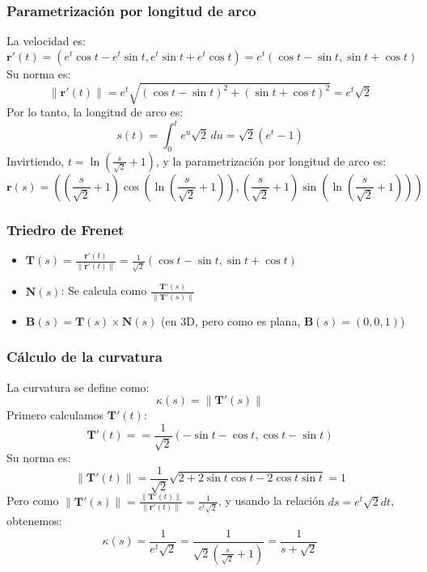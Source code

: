 \documentclass[11pt]{book}
\theoremstyle{definicion}
\theoremstyle{teorema}
\theoremstyle{ejemplo}
\begin{document}
\subsubsection{Parametrización por longitud de arco}
\noindent La velocidad es:
\[
\mathbf{r}'(t) = (e^t \cos t - e^t \sin t, e^t \sin t + e^t \cos t) = e^t (\cos t - \sin t, \sin t + \cos t)
\]
Su norma es:
\[
\|\mathbf{r}'(t)\| = e^t \sqrt{(\cos t - \sin t)^2 + (\sin t + \cos t)^2} = e^t \sqrt{2}
\]
Por lo tanto, la longitud de arco es:
\[
s(t) = \int_0^t e^u \sqrt{2} \, du = \sqrt{2} (e^t - 1)
\]
Invirtiendo, \(t = \ln\left(\frac{s}{\sqrt{2}} + 1\right)\), y la parametrización por longitud de arco es:
\[
\mathbf{r}(s) = \left(\left(\frac{s}{\sqrt{2}} + 1\right) \cos\left(\ln\left(\frac{s}{\sqrt{2}} + 1\right)\right), \left(\frac{s}{\sqrt{2}} + 1\right) \sin\left(\ln\left(\frac{s}{\sqrt{2}} + 1\right)\right)\right)
\]

\subsubsection{Triedro de Frenet}
\begin{itemize}
    \item \(\mathbf{T}(s) = \frac{\mathbf{r}'(t)}{\|\mathbf{r}'(t)\|} = \frac{1}{\sqrt{2}} (\cos t - \sin t, \sin t + \cos t)\)
    \item \(\mathbf{N}(s)\): Se calcula como \(\frac{\mathbf{T}'(s)}{\|\mathbf{T}'(s)\|}\)
    \item \(\mathbf{B}(s) = \mathbf{T}(s) \times \mathbf{N}(s)\) (en 3D, pero como es plana, \(\mathbf{B}(s) = (0,0,1)\))
\end{itemize}

\subsubsection{Cálculo de la curvatura}
\noindent
La curvatura se define como:
\[
\kappa(s) = \|\mathbf{T}'(s)\|
\]
Primero calculamos \(\mathbf{T}'(t)\):
\[
\mathbf{T}'(t) = %
= \frac{1}{\sqrt{2}} (-\sin t - \cos t, \cos t - \sin t)
\]
Su norma es:
\[
\|\mathbf{T}'(t)\| %
= \frac{1}{\sqrt{2}} \sqrt{2 + 2 \sin t \cos t - 2 \cos t \sin t} = 1
\]
Pero como \(\|\mathbf{T}'(s)\| = \frac{\|\mathbf{T}'(t)\|}{\|\mathbf{r}'(t)\|} = \frac{1}{e^t \sqrt{2}}\), y usando la relación \(ds = e^t \sqrt{2} dt\), obtenemos:
\[
\kappa(s) = \frac{1}{e^t \sqrt{2}} = \frac{1}{\sqrt{2} \left(\frac{s}{\sqrt{2}} + 1\right)} = \frac{1}{s + \sqrt{2}}
\]
\end{document}
